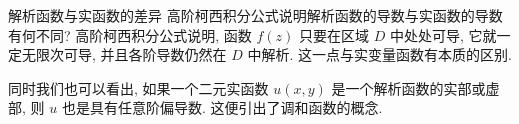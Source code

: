 \begin{frame}{解析函数与实函数的差异}
	\onslide<+->
	高阶柯西积分公式说明解析函数的导数与实函数的导数有何不同?
	\onslide<+->
	高阶柯西积分公式说明, 函数 $f(z)$ 只要在区域 $D$ 中处处可导, 它就一定无限次可导, 并且各阶导数仍然在 $D$ 中解析.
	\onslide<+->
	\alert{这一点与实变量函数有本质的区别.}

	\onslide<+->
	同时我们也可以看出, 如果一个二元实函数 $u(x,y)$ 是一个解析函数的实部或虚部, 则 $u$ 也是具有任意阶偏导数.
	\onslide<+->
	这便引出了调和函数的概念.
\end{frame}


